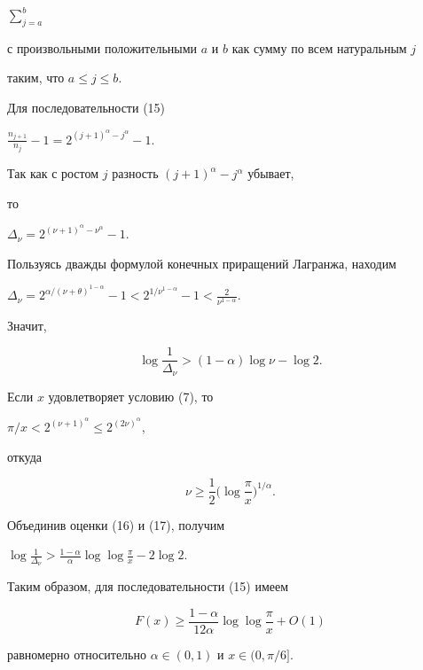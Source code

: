 $\sum\limits_{j = a}^b$


с произвольными положительными $a$ и $b$ как сумму по всем натуральным $j$


таким, что $a \le j \le b$.


Для последовательности (15)


$\frac{n_{j + 1}}{n_j} - 1 = 2^{(j + 1)^{\alpha} - j^{\alpha}} - 1$.


Так как с ростом $j$ разность $(j + 1)^{\alpha} - j^{\alpha}$ убывает,


то


$\Delta_{\nu} = 2^{(\nu + 1)^{\alpha} - \nu^{\alpha}} - 1$.


Пользуясь дважды формулой конечных приращений Лагранжа, находим


$\Delta_{\nu} = 2^{\alpha / (\nu + \theta)^{1 - \alpha}} - 1 <


2^{1 / \nu^{1 - \alpha}} - 1 < \frac{2}{\nu^{1 - \alpha}}$.


Значит,


\begin{equation}


\log \frac{1}{\Delta_{\nu}} > (1 - \alpha) \log \nu - \log 2.


\end{equation}


Если $x$ удовлетворяет условию (7), то


$\pi/x < 2^{(\nu + 1)^{\alpha}} \le 2^{(2 \nu)^{\alpha}}$,


откуда


\begin{equation}


\nu \ge \frac{1}{2} \bigg ( \log \frac{\pi}{x} \bigg )^{1 / \alpha}.


\end{equation}


Объединив оценки (16) и (17), получим


$\log \frac{1}{\Delta_{\nu}} >


\frac{1 - \alpha}{\alpha} \log \log \frac{\pi}{x} - 2 \log 2$.





Таким образом, для последовательности (15) имеем


$$


F(x) \ge \frac{1 - \alpha}{12 \alpha} \log \log \frac{\pi}{x} + O(1)


$$


равномерно относительно $\alpha \in (0, 1)$ и $x \in (0, \pi / 6]$.


